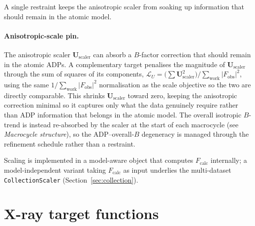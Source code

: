 \documentclass{iucrjournals}
\begin{document}
A single restraint keeps the anisotropic scaler from soaking up information that
should remain in the atomic model.

\paragraph{Anisotropic-scale pin.}
The anisotropic scaler $\mathbf{U}_\mathrm{scaler}$ can absorb a $B$-factor
correction that should remain in the atomic ADPs.  A complementary target penalises
the magnitude of $\mathbf{U}_\mathrm{scaler}$ through the sum of squares of its
components,
$\mathcal{L}_{U} = \bigl(\sum \mathbf{U}_\mathrm{scaler}^{2}\bigr)\big/
\sum_\mathrm{work}|F_\mathrm{obs}|^{2}$,
using the same $1/\sum_\mathrm{work}|F_\mathrm{obs}|^{2}$ normalisation as the scale
objective so the two are directly comparable.  This shrinks
$\mathbf{U}_\mathrm{scaler}$ toward zero, keeping the anisotropic correction minimal so
it captures only what the data genuinely require rather than ADP information that
belongs in the atomic model.  The overall isotropic $B$-trend is instead re-absorbed
by the scaler at the start of each macrocycle (see \emph{Macrocycle structure}), so
the ADP--overall-$B$ degeneracy is managed through the refinement schedule rather than
a restraint.

Scaling is implemented in a model-aware object that computes
$F_\mathrm{calc}$ internally; a model-independent variant taking
$F_\mathrm{calc}$ as input underlies the multi-dataset
\texttt{CollectionScaler} (Section~\ref{sec:collection}).

\section{X-ray target functions}
\end{document}
